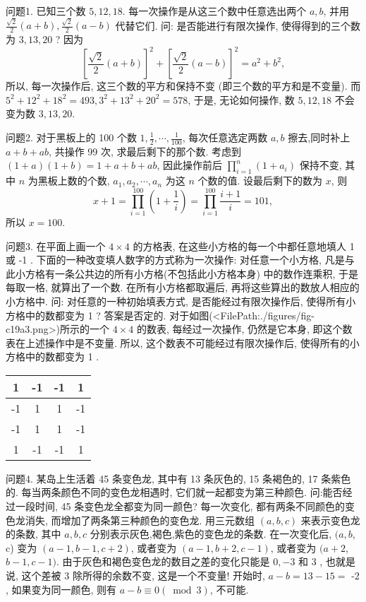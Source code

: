 
问题1. 已知三个数 $5,12,18$. 每一次操作是从这三个数中任意选出两个 $a, b$, 并用 $\frac{\sqrt{2}}{2}(a+b), \frac{\sqrt{2}}{2}(a-b)$ 代替它们.
问: 是否能进行有限次操作, 使得得到的三个数为 $3,13,20$ ?
因为
$$
\left[\frac{\sqrt{2}}{2}(a+b)\right]^2+\left[\frac{\sqrt{2}}{2}(a-b)\right]^2=a^2+b^2,
$$
所以, 每一次操作后, 这三个数的平方和保持不变 (即三个数的平方和是不变量). 而 $5^2+12^2+18^2=493,3^2+13^2+20^2=578$, 于是, 无论如何操作, 数 $5,12,18$ 不会变为数 $3,13,20$.



问题2. 对于黑板上的 100 个数 $1, \frac{1}{2}, \cdots, \frac{1}{100}$, 每次任意选定两数 $a, b$ 擦去,同时补上 $a+b+a b$, 共操作 99 次, 求最后剩下的那个数.
考虑到 $(1+a)(1+b)=1+a+b+a b$, 因此操作前后 $\prod_{i=1}^n\left(1+a_i\right)$ 保持不变, 其中 $n$ 为黑板上数的个数, $a_1, a_2, \cdots, a_n$ 为这 $n$ 个数的值.
设最后剩下的数为 $x$, 则
$$
x+1=\prod_{i=1}^{100}\left(1+\frac{1}{i}\right)=\prod_{i=1}^{100} \frac{i+1}{i}=101,
$$
所以 $x=100$.



问题3. 在平面上画一个 $4 \times 4$ 的方格表, 在这些小方格的每一个中都任意地填人 1 或 -1 . 下面的一种改变填人数字的方式称为一次操作: 对任意一个小方格, 凡是与此小方格有一条公共边的所有小方格(不包括此小方格本身) 中的数作连乘积, 于是每取一格, 就算出了一个数.
在所有小方格都取遍后, 再将这些算出的数放人相应的小方格中.
问: 对任意的一种初始填表方式, 是否能经过有限次操作后, 使得所有小方格中的数都变为 1 ?
答案是否定的.
对于如图(<FilePath:./figures/fig-c19a3.png>)所示的一个 $4 \times 4$ 的数表, 每经过一次操作, 仍然是它本身, 即这个数表在上述操作中是不变量.
所以, 这个数表不可能经过有限次操作后, 使得所有的小方格中的数都变为 1 .
\begin{tabular}{|c|c|c|c|}
\hline 1 & -1 & -1 & 1 \\
\hline-1 & 1 & 1 & -1 \\
\hline-1 & 1 & 1 & -1 \\
\hline 1 & -1 & -1 & 1 \\
\hline
\end{tabular}



问题4. 某岛上生活着 45 条变色龙, 其中有 13 条灰色的, 15 条褐色的, 17 条紫色的.
每当两条颜色不同的变色龙相遇时, 它们就一起都变为第三种颜色.
问:能否经过一段时间, 45 条变色龙全都变为同一颜色?
每一次变化, 都有两条不同颜色的变色龙消失, 而增加了两条第三种颜色的变色龙.
用三元数组 $(a, b, c)$ 来表示变色龙的条数, 其中 $a, b, c$ 分别表示灰色,褐色,紫色的变色龙的条数.
在一次变化后, $(a, b$, c) 变为 $(a-1, b-1, c+2)$, 或者变为 $(a-1, b+2, c-1)$, 或者变为 $(a+2$, $b-1, c-1)$.
由于灰色和褐色变色龙的数目之差的变化只能是 $0,-3$ 和 3 , 也就是说, 这个差被 3 除所得的余数不变, 这是一个不变量! 开始时, $a-b=13-15=$ -2 , 如果变为同一颜色, 则有 $a-b \equiv 0(\bmod 3)$, 不可能.



